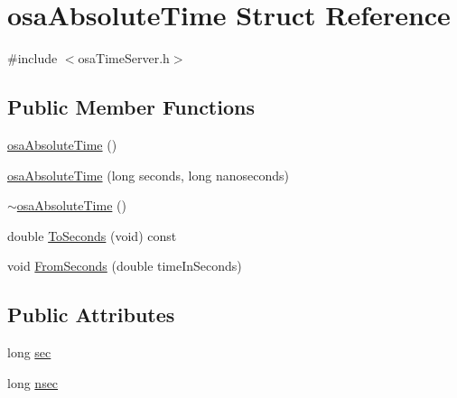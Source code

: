 \hypertarget{structosa_absolute_time}{\section{osa\-Absolute\-Time Struct Reference}
\label{structosa_absolute_time}
}


{\ttfamily \#include $<$osa\-Time\-Server.\-h$>$}

\subsection*{Public Member Functions}
\begin{DoxyCompactItemize}
\item 
\hyperlink{structosa_absolute_time_a4c45c36514831a65da3a9cff5bf70be9}{osa\-Absolute\-Time} ()
\item 
\hyperlink{structosa_absolute_time_a58be692d7b5b555fb2855fcb5b14532d}{osa\-Absolute\-Time} (long seconds, long nanoseconds)
\item 
\hyperlink{structosa_absolute_time_ae1c2ef6be95c91d72806e4d1b0467957}{$\sim$osa\-Absolute\-Time} ()
\item 
double \hyperlink{structosa_absolute_time_a51c0657f31e0aa44f6a72d7e96b11598}{To\-Seconds} (void) const 
\item 
void \hyperlink{structosa_absolute_time_ab333f8c4a8807ad91d45428be471ee94}{From\-Seconds} (double time\-In\-Seconds)
\end{DoxyCompactItemize}
\subsection*{Public Attributes}
\begin{DoxyCompactItemize}
\item 
long \hyperlink{structosa_absolute_time_a64e52ede3b458f455adc45bd5e07bd36}{sec}
\item 
long \hyperlink{structosa_absolute_time_a2f5e9806cf523d92b2c409687e75b214}{nsec}
\end{DoxyCompactItemize}


